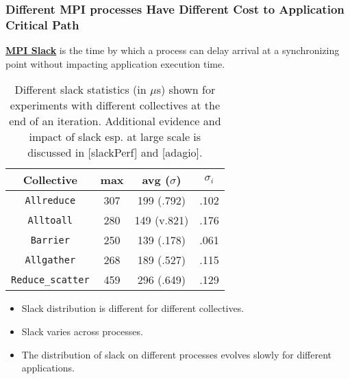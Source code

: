 \begin{frame}
\frametitle{Different MPI processes Have Different Cost to Application Critical Path}
{\tiny \underline{\textbf{MPI Slack}} is the time by which a process
  can delay arrival at a synchronizing point without impacting application execution time.}
%
\begin{table}[tr]
\label{fig:collectiveSlack-useq}
  \begin{center}
    \begin{tabular}{ | c || c | c || c |}
      \hline
      \textbf{Collective} &      \textbf{max} & \textbf{avg ($\sigma$)} & \textbf{$\sigma_i$} \\ 
\hline
      \texttt{Allreduce} &             307    &    199 (.792) &            .102 \\ 
\hline
      \texttt{Alltoall}  &             280    &    149 (v.821) &            .176 \\ 
\hline
      \texttt{Barrier}  &              250    &    139 (.178)  &           .061 \\ 
\hline
      \texttt{Allgather} &             268    &    189 (.527) &            .115 \\
\hline
      \texttt{Reduce\_scatter} &       459    &    296  (.649)  &          .129 \\ 
\hline
    \end{tabular}
  \end{center}
  \caption{\label{fig:collectiveSlack-useq} {\small Different slack statistics (in $\mu$s) shown for experiments with different collectives at the end of an iteration. Additional evidence and impact of slack esp. at large scale is discussed in [slackPerf] and [adagio].}}
\end{table}

\begin{itemize}
\tiny \item \tiny Slack distribution is different for different collectives.
\item \tiny Slack varies across processes.
\item \tiny The distribution of slack on different processes evolves slowly for different applications. 
\end{itemize}
\end{frame}

